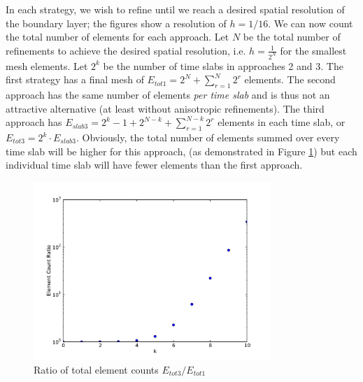 \documentclass[Dissertation.tex]{subfiles}
\begin{document}
In each strategy, we wish to refine until we reach a desired spatial resolution of the boundary layer; the figures show a resolution of $h=1/16$.
We can now count the total number of elements for each approach. 
Let $N$ be the total number of refinements to achieve the desired spatial resolution, i.e. $h=\frac{1}{2^N}$
for the smallest mesh elements.
Let $2^k$ be the number of time slabs in approaches 2 and 3.
The first strategy has a final mesh of 
$
E_{tot1}=2^N+\sum_{r=1}^N 2^r
$
elements.
The second approach has the same number of elements \emph{per time slab} and is thus not an attractive alternative 
(at least without anisotropic refinements).
The third approach has
$  
E_{slab3}=2^{k}-1+2^{N-k}+\sum_{r=1}^{N-k}2^r
$
elements in each time slab, or $E_{tot3}=2^k\cdot E_{slab3}$.
Obviously, the total number of elements summed over every time slab will be higher for this approach, 
(as demonstrated in Figure \ref{fig:ElementCountRatio})
but each individual time slab will have fewer elements than the first approach.

\begin{figure}
\centering
\includegraphics[width=0.8\textwidth]{Dissertation/Scaling/RatioElementCount.pdf}
\caption{Ratio of total element counts $E_{tot3}/E_{tot1}$}
\label{fig:ElementCountRatio}
\end{figure}
\end{document}
